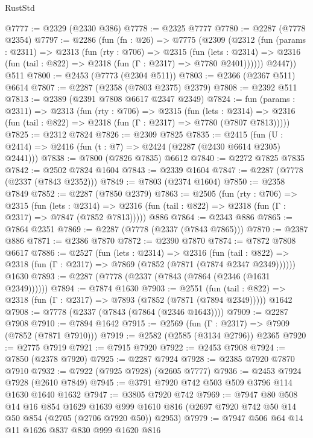 \begin{lexlean}{RustStd}
\begin{coremodule}
@7777 := @2329 (@2330 @386)
@7778 := @2325 @7777
@7780 := @2287 (@7778 @2354)
@7797 := @2286
    (fun (fn : @26) =>
    @7775
      (@2309
        (@2312
          (fun (params : @2311) =>
          @2313
            (fun (rty : @706) =>
            @2315
              (fun (lets : @2314) =>
              @2316 (fun (tail : @822) => @2318 (fun (Γ : @2317) => @7780 @2401))))))
        @2447))
    @511
@7800 := @2453 (@7773 (@2304 @511))
@7803 := @2366 (@2367 @511) @6614
@7807 := @2287 (@2358 (@7803 @2375) @2379)
@7808 := @2392 @511
@7813 := @2389 (@2391 @7808 @6617 @2347 @2349)
@7824 := fun (params : @2311) =>
  @2313
    (fun (rty : @706) =>
    @2315
      (fun (lets : @2314) =>
      @2316 (fun (tail : @822) => @2318 (fun (Γ : @2317) => @7780 (@7807 @7813)))))
@7825 := @2312 @7824
@7826 := @2309 @7825
@7835 := @2415 (fun (U : @2414) => @2416 (fun (t : @7) => @2424 (@2287 (@2430 @6614 @2305) @2441)))
@7838 := @7800 (@7826 @7835) @6612
@7840 := @2272 @7825 @7835
@7842 := @2502 @7824 @1604
@7843 := @2339 @1604
@7847 := @2287 (@7778 (@2337 (@7843 @2352)))
@7849 := @7803 (@2374 @1604)
@7850 := @2358 @7849
@7852 := @2287 (@7850 @2379)
@7863 := @2505
    (fun (rty : @706) =>
    @2315
      (fun (lets : @2314) =>
      @2316 (fun (tail : @822) => @2318 (fun (Γ : @2317) => @7847 (@7852 @7813)))))
    @886
@7864 := @2343 @886
@7865 := @7864 @2351
@7869 := @2287 (@7778 (@2337 (@7843 @7865)))
@7870 := @2387 @886
@7871 := @2386 @7870
@7872 := @2390 @7870
@7874 := @7872 @7808 @6617
@7886 := @2527
    (fun (lets : @2314) =>
    @2316
      (fun (tail : @822) => @2318 (fun (Γ : @2317) => @7869 (@7852 (@7871 (@7874 @2347 @2349))))))
    @1630
@7893 := @2287 (@7778 (@2337 (@7843 (@7864 (@2346 (@1631 @2349))))))
@7894 := @7874 @1630
@7903 := @2551
    (fun (tail : @822) => @2318 (fun (Γ : @2317) => @7893 (@7852 (@7871 (@7894 @2349)))))
    @1642
@7908 := @7778 (@2337 (@7843 (@7864 (@2346 @1643))))
@7909 := @2287 @7908
@7910 := @7894 @1642
@7915 := @2569 (fun (Γ : @2317) => @7909 (@7852 (@7871 @7910)))
@7919 := @2582 (@2585 (@3134 @2796)) @2365
@7920 := @2775 @7919
@7921 := @7915 @7920
@7922 := @2453 @7908
@7924 := @7850 (@2378 @7920)
@7925 := @2287 @7924
@7928 := @2385 @7920 @7870 @7910
@7932 := @7922 (@7925 @7928) (@2605 @7777)
@7936 := @2453 @7924 @7928 (@2610 @7849)
@7945 := @3791 @7920 @742 @503 @509 @3796 @114 @1630 @1640 @1632
@7947 := @3805 @7920 @742
@7969 := @7947
    @80
    @508
    @14
    @16
    @854
    @1629
    @1639
    @999
    @1610
    @816
    (@2697 @7920 @742 @50 @14 @50 @854 (@2705 (@2706 @7920 @50)) @2953)
@7979 := @7947 @506 @64 @14 @11 @1626 @837 @830 @999 @1620 @816

\end{coremodule}
\end{lexlean}
